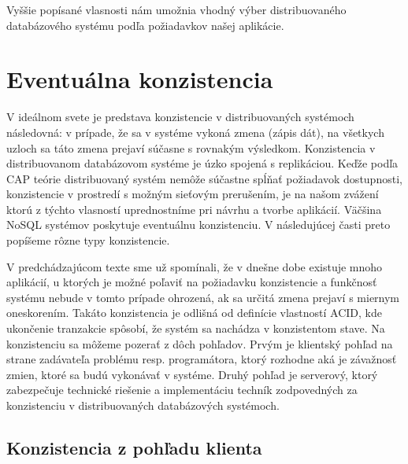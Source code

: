 \documentclass[11pt,twoside,a4paper]{book}
\begin{document}
Vyššie popísané vlasnosti nám umožnia vhodný výber distribuovaného databázového systému podľa požiadavkov našej aplikácie.

%





\section{Eventuálna konzistencia}
V ideálnom svete je predstava konzistencie v distribuovaných systémoch následovná: v prípade, že sa v systéme vykoná zmena (zápis dát), na všetkych uzloch sa táto zmena prejaví súčasne s rovnakým výsledkom. Konzistencia v distribuovanom databázovom systéme je úzko spojená s replikáciou. Keďže podľa CAP teórie distribuovaný systém  nemôže súčastne spĺňať požiadavok dostupnosti, konzistencie v prostredí s možným sieťovým prerušením, je na našom zvážení ktorú z týchto vlasností uprednostníme pri návrhu a tvorbe aplikácií. Väčšina NoSQL systémov poskytuje eventuálnu konzistenciu. V následujúcej časti preto popíšeme rôzne typy konzistencie.

V predchádzajúcom texte sme už spomínali, že v dnešne dobe existuje mnoho aplikácií, u ktorých je možné poľaviť na požiadavku konzistencie a funkčnosť systému nebude v tomto prípade ohrozená, ak sa určitá zmena prejaví s miernym oneskorením. Takáto konzistencia je odlišná od definície vlastností ACID, kde ukončenie tranzakcie spôsobí, že systém sa nachádza v konzistentom stave. Na konzistenciu sa môžeme pozerať z dôch pohľadov. Prvým je klientský pohľad na strane zadávateľa problému resp. programátora, ktorý rozhodne aká je závažnosť zmien, ktoré sa budú vykonávať v systéme. Druhý pohľad je serverový, ktorý zabezpečuje technické riešenie a implementáciu techník  zodpovedných za konzistenciu v distribuovaných databázových systémoch.


\subsection{Konzistencia z pohľadu klienta}
\end{document}
